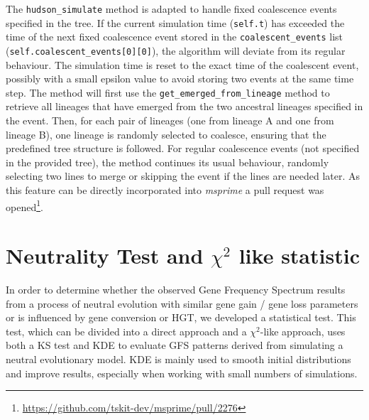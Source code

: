 The \texttt{hudson_simulate} method is adapted to handle fixed coalescence events specified in the tree.
If the current simulation time (\texttt{self.t}) has exceeded the time of the next fixed coalescence event
stored in the \texttt{coalescent_events} list (\texttt{self.coalescent_events[0][0]}),
the algorithm will deviate from its regular behaviour.
The simulation time is reset to the exact time of the coalescent event, possibly with a small epsilon value to
avoid storing two events at the same time step.
The method will first use the \texttt{get_emerged_from_lineage} method to retrieve all lineages that have emerged from the two ancestral lineages specified in the event.
Then, for each pair of lineages (one from lineage A and one from lineage B), one lineage is randomly selected to coalesce,
ensuring that the predefined tree structure is followed.
For regular coalescence events (not specified in the provided tree), the method continues its usual behaviour, randomly selecting two lines to merge or skipping the event if the lines are needed later.
As this feature can be directly incorporated into \textit{msprime} a pull request was opened\footnote{\href{https://github.com/tskit-dev/msprime/pull/2276}{https://github.com/tskit-dev/msprime/pull/2276}}.

\section{Neutrality Test and $\chi^2$ like statistic}
In order to determine whether the observed Gene Frequency Spectrum results from a process of neutral evolution with similar gene gain / gene loss parameters or is influenced by gene conversion or \ac{HGT}, we developed a statistical test.
This test, which can be divided into a direct approach and a $\chi^2$-like approach, uses both a \ac{KS} test and \ac{KDE} to evaluate \ac{GFS} patterns derived from simulating a neutral evolutionary model.
KDE is mainly used to smooth initial distributions and improve results, especially when working with small numbers of simulations.


